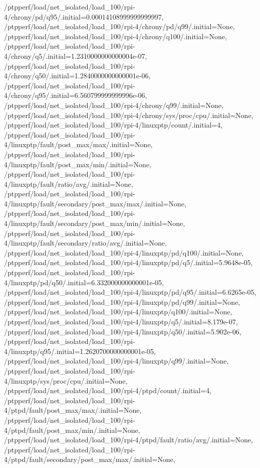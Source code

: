 {    /ptpperf/load/net_isolated/load_100/rpi-4/chrony/pd/q95/.initial=0.00014108999999999997,
    /ptpperf/load/net_isolated/load_100/rpi-4/chrony/pd/q99/.initial=None,
    /ptpperf/load/net_isolated/load_100/rpi-4/chrony/q100/.initial=None,
    /ptpperf/load/net_isolated/load_100/rpi-4/chrony/q5/.initial=1.2310000000000004e-07,
    /ptpperf/load/net_isolated/load_100/rpi-4/chrony/q50/.initial=1.2840000000000001e-06,
    /ptpperf/load/net_isolated/load_100/rpi-4/chrony/q95/.initial=6.560799999999996e-06,
    /ptpperf/load/net_isolated/load_100/rpi-4/chrony/q99/.initial=None,
    /ptpperf/load/net_isolated/load_100/rpi-4/chrony/sys/proc/cpu/.initial=None,
    /ptpperf/load/net_isolated/load_100/rpi-4/linuxptp/count/.initial=4,
    /ptpperf/load/net_isolated/load_100/rpi-4/linuxptp/fault/post_max/max/.initial=None,
    /ptpperf/load/net_isolated/load_100/rpi-4/linuxptp/fault/post_max/min/.initial=None,
    /ptpperf/load/net_isolated/load_100/rpi-4/linuxptp/fault/ratio/avg/.initial=None,
    /ptpperf/load/net_isolated/load_100/rpi-4/linuxptp/fault/secondary/post_max/max/.initial=None,
    /ptpperf/load/net_isolated/load_100/rpi-4/linuxptp/fault/secondary/post_max/min/.initial=None,
    /ptpperf/load/net_isolated/load_100/rpi-4/linuxptp/fault/secondary/ratio/avg/.initial=None,
    /ptpperf/load/net_isolated/load_100/rpi-4/linuxptp/pd/q100/.initial=None,
    /ptpperf/load/net_isolated/load_100/rpi-4/linuxptp/pd/q5/.initial=5.9648e-05,
    /ptpperf/load/net_isolated/load_100/rpi-4/linuxptp/pd/q50/.initial=6.332000000000001e-05,
    /ptpperf/load/net_isolated/load_100/rpi-4/linuxptp/pd/q95/.initial=6.6265e-05,
    /ptpperf/load/net_isolated/load_100/rpi-4/linuxptp/pd/q99/.initial=None,
    /ptpperf/load/net_isolated/load_100/rpi-4/linuxptp/q100/.initial=None,
    /ptpperf/load/net_isolated/load_100/rpi-4/linuxptp/q5/.initial=8.179e-07,
    /ptpperf/load/net_isolated/load_100/rpi-4/linuxptp/q50/.initial=5.902e-06,
    /ptpperf/load/net_isolated/load_100/rpi-4/linuxptp/q95/.initial=1.2620700000000001e-05,
    /ptpperf/load/net_isolated/load_100/rpi-4/linuxptp/q99/.initial=None,
    /ptpperf/load/net_isolated/load_100/rpi-4/linuxptp/sys/proc/cpu/.initial=None,
    /ptpperf/load/net_isolated/load_100/rpi-4/ptpd/count/.initial=4,
    /ptpperf/load/net_isolated/load_100/rpi-4/ptpd/fault/post_max/max/.initial=None,
    /ptpperf/load/net_isolated/load_100/rpi-4/ptpd/fault/post_max/min/.initial=None,
    /ptpperf/load/net_isolated/load_100/rpi-4/ptpd/fault/ratio/avg/.initial=None,
    /ptpperf/load/net_isolated/load_100/rpi-4/ptpd/fault/secondary/post_max/max/.initial=None,
}
